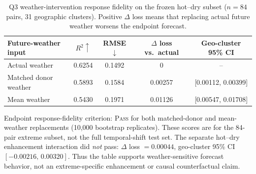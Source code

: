 \begin{table}[t]
\centering
\small
\caption{Q3 weather-intervention response fidelity on the frozen hot--dry
subset ($n=84$ pairs, 31 geographic clusters). Positive $\Delta$ loss means
that replacing actual future weather worsens the endpoint forecast.}
\label{tab:q3_weather_intervention}
\begin{tabular}{lcccc}
\toprule
Future-weather input & $R^2 \uparrow$ & RMSE $\downarrow$ &
$\Delta$ loss vs.\ actual & Geo-cluster 95\% CI \\
\midrule
Actual weather        & 0.6254 & 0.1492 & 0       & -- \\
Matched donor weather & 0.5893 & 0.1584 & 0.00257 & [0.00112, 0.00399] \\
Mean weather          & 0.5430 & 0.1971 & 0.01126 & [0.00547, 0.01708] \\
\bottomrule
\end{tabular}

\vspace{2pt}
\parbox{0.98\linewidth}{\footnotesize
Endpoint response-fidelity criterion: \textsc{Pass} for both matched-donor and
mean-weather replacements (10,000 bootstrap replicates). These scores are for
the 84-pair extreme subset, not the full temporal-shift test set. The separate
hot--dry enhancement interaction did \emph{not} pass:
$\Delta$ loss $=0.00044$, geo-cluster 95\% CI
$[-0.00216,\,0.00320]$. Thus the table supports weather-sensitive forecast
behavior, not an extreme-specific enhancement or causal counterfactual claim.}
\end{table}
